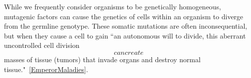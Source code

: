 \documentclass[../../main.tex]{subfiles}
\begin{document}
While we frequently consider organisms to be genetically homogeneous, mutagenic factors can cause the genetics of cells within an organism to diverge from the germline genotype. These somatic mutations are often inconsequential, but when they cause a cell to gain ``an autonomous will to divide, this aberrant uncontrolled cell division \[ can create \] masses of tissue (tumors) that invade organs and destroy normal tissue."~\ref{EmperorMaladies}. 



\end{document}
